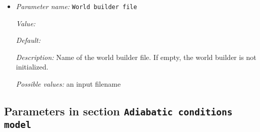 \begin{itemize}
{\it Value:} false


{\it Default:} true


{\it Description:} When computing results for mantle convection simulations, it is often difficult to judge the order of magnitude of results when they are stated in MKS units involving seconds. Rather, some kinds of results such as velocities are often stated in terms of meters per year (or, sometimes, centimeters per year). On the other hand, for non-dimensional computations, one wants results in their natural unit system as used inside the code. If this flag is set to `true' conversion to years happens; if it is `false', no such conversion happens. Note that when `true', some input such as prescribed velocities should also use years instead of seconds.


{\it Possible values:} A boolean value (true or false)
\item {\it Parameter name:} {\tt World builder file}
\label{parameters:World builder file}
\label{parameters:World_20builder_20file}


{\it Value:} 


{\it Default:} 


{\it Description:} Name of the world builder file. If empty, the world builder is not initialized.


{\it Possible values:} an input filename
\end{itemize}



\subsection{Parameters in section \tt Adiabatic conditions model}
\label{parameters:Adiabatic_20conditions_20model}

